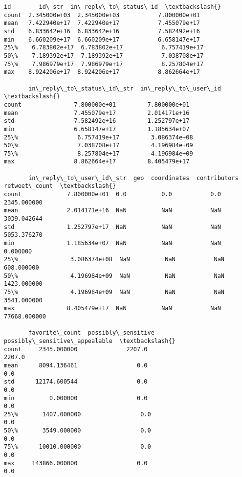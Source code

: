 \documentclass[11pt]{article}
\makeatletter
\newcommand{\boxspacing}{\kern\kvtcb@left@rule\kern\kvtcb@boxsep}
\newcommand{\prompt}[4]{
        {\ttfamily\llap{{\color{#2}[#3]:\hspace{3pt}#4}}\vspace{-\baselineskip}}
    }
\makeatother
\begin{document}
            \begin{tcolorbox}[breakable, size=fbox, boxrule=.5pt, pad at break*=1mm, opacityfill=0]
\prompt{Out}{outcolor}{64}{\boxspacing}
\begin{Verbatim}[commandchars=\\\{\}]
                 id        id\_str  in\_reply\_to\_status\_id  \textbackslash{}
count  2.345000e+03  2.345000e+03           7.800000e+01
mean   7.422940e+17  7.422940e+17           7.455079e+17
std    6.833642e+16  6.833642e+16           7.582492e+16
min    6.660209e+17  6.660209e+17           6.658147e+17
25\%    6.783802e+17  6.783802e+17           6.757419e+17
50\%    7.189392e+17  7.189392e+17           7.038708e+17
75\%    7.986979e+17  7.986979e+17           8.257804e+17
max    8.924206e+17  8.924206e+17           8.862664e+17

       in\_reply\_to\_status\_id\_str  in\_reply\_to\_user\_id  \textbackslash{}
count               7.800000e+01         7.800000e+01
mean                7.455079e+17         2.014171e+16
std                 7.582492e+16         1.252797e+17
min                 6.658147e+17         1.185634e+07
25\%                 6.757419e+17         3.086374e+08
50\%                 7.038708e+17         4.196984e+09
75\%                 8.257804e+17         4.196984e+09
max                 8.862664e+17         8.405479e+17

       in\_reply\_to\_user\_id\_str  geo  coordinates  contributors  retweet\_count  \textbackslash{}
count             7.800000e+01  0.0          0.0           0.0    2345.000000
mean              2.014171e+16  NaN          NaN           NaN    3039.042644
std               1.252797e+17  NaN          NaN           NaN    5053.376270
min               1.185634e+07  NaN          NaN           NaN       0.000000
25\%               3.086374e+08  NaN          NaN           NaN     608.000000
50\%               4.196984e+09  NaN          NaN           NaN    1423.000000
75\%               4.196984e+09  NaN          NaN           NaN    3541.000000
max               8.405479e+17  NaN          NaN           NaN   77668.000000

       favorite\_count  possibly\_sensitive  possibly\_sensitive\_appealable  \textbackslash{}
count     2345.000000              2207.0                         2207.0
mean      8094.136461                 0.0                            0.0
std      12174.600544                 0.0                            0.0
min          0.000000                 0.0                            0.0
25\%       1407.000000                 0.0                            0.0
50\%       3549.000000                 0.0                            0.0
75\%      10010.000000                 0.0                            0.0
max     143866.000000                 0.0                            0.0


\end{Verbatim}
\end{tcolorbox}
\end{document}
